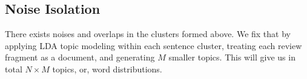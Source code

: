 \documentclass[10pt,final,conference,letterpaper]{IEEEtran}
\newcommand{\tabref}[1]{Table \ref{#1}}
\begin{document}
\subsection{Noise Isolation}
There exists noises and overlaps in the clusters formed above.
%
%
%
We fix that by applying LDA topic modeling within each sentence cluster, 
treating each review fragment as a document, and generating $M$ smaller topics. 
This will give us in total $N\times M$ topics, or, word distributions. 
%
\end{document}
